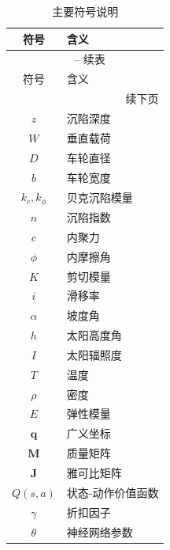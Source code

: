 \begin{longtable}{cl}
    \caption{主要符号说明} \label{tab:symbols} \\
    \toprule
    符号 & 含义 \\
    \midrule
    \endfirsthead
    \multicolumn{2}{c}{\tablename\ \thetable{} -- 续表} \\
    \toprule
    符号 & 含义 \\
    \midrule
    \endhead
    \midrule
    \multicolumn{2}{r}{续下页} \\
    \endfoot
    \bottomrule
    \endlastfoot
    
    $z$ & 沉陷深度 \\
    $W$ & 垂直载荷 \\
    $D$ & 车轮直径 \\
    $b$ & 车轮宽度 \\
    $k_c, k_\phi$ & 贝克沉陷模量 \\
    $n$ & 沉陷指数 \\
    $c$ & 内聚力 \\
    $\phi$ & 内摩擦角 \\
    $K$ & 剪切模量 \\
    $i$ & 滑移率 \\
    $\alpha$ & 坡度角 \\
    $h$ & 太阳高度角 \\
    $I$ & 太阳辐照度 \\
    $T$ & 温度 \\
    $\rho$ & 密度 \\
    $E$ & 弹性模量 \\
    $\mathbf{q}$ & 广义坐标 \\
    $\mathbf{M}$ & 质量矩阵 \\
    $\mathbf{J}$ & 雅可比矩阵 \\
    $Q(s,a)$ & 状态-动作价值函数 \\
    $\gamma$ & 折扣因子 \\
    $\theta$ & 神经网络参数 \\
    
\end{longtable}
